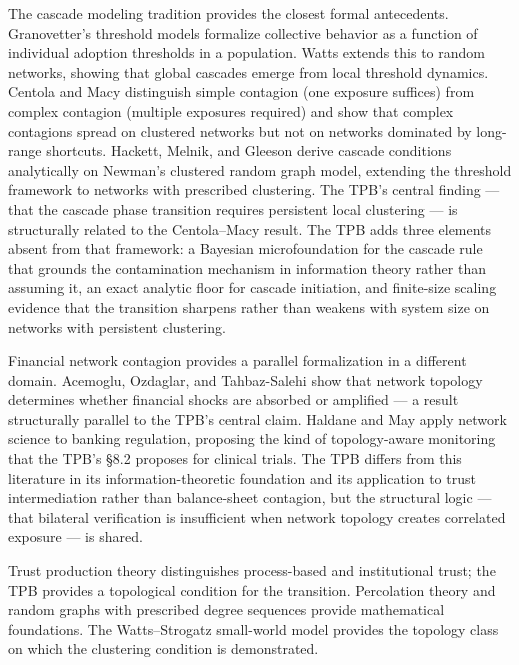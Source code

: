 \documentclass[11pt,a4paper]{article}
\begin{document}
The cascade modeling tradition provides the closest formal antecedents. Granovetter's threshold models \cite{granovetter1978} formalize collective behavior as a function of individual adoption thresholds in a population. Watts \cite{watts2002} extends this to random networks, showing that global cascades emerge from local threshold dynamics. Centola and Macy \cite{centola2007} distinguish simple contagion (one exposure suffices) from complex contagion (multiple exposures required) and show that complex contagions spread on clustered networks but not on networks dominated by long-range shortcuts. Hackett, Melnik, and Gleeson \cite{hackett2011} derive cascade conditions analytically on Newman's clustered random graph model, extending the threshold framework to networks with prescribed clustering. The TPB's central finding --- that the cascade phase transition requires persistent local clustering --- is structurally related to the Centola--Macy result. The TPB adds three elements absent from that framework: a Bayesian microfoundation for the cascade rule that grounds the contamination mechanism in information theory rather than assuming it, an exact analytic floor for cascade initiation, and finite-size scaling evidence that the transition sharpens rather than weakens with system size on networks with persistent clustering.

Financial network contagion provides a parallel formalization in a different domain. Acemoglu, Ozdaglar, and Tahbaz-Salehi \cite{acemoglu2015} show that network topology determines whether financial shocks are absorbed or amplified --- a result structurally parallel to the TPB's central claim. Haldane and May \cite{haldane2011} apply network science to banking regulation, proposing the kind of topology-aware monitoring that the TPB's \S8.2 proposes for clinical trials. The TPB differs from this literature in its information-theoretic foundation and its application to trust intermediation rather than balance-sheet contagion, but the structural logic --- that bilateral verification is insufficient when network topology creates correlated exposure --- is shared.

Trust production theory \cite{zucker1986} distinguishes process-based and institutional trust; the TPB provides a topological condition for the transition. Percolation theory \cite{broadbent1957,stauffer1994} and random graphs with prescribed degree sequences \cite{molloy1995} provide mathematical foundations. The Watts--Strogatz small-world model \cite{wattsstrogatz1998} provides the topology class on which the clustering condition is demonstrated.
\end{document}
